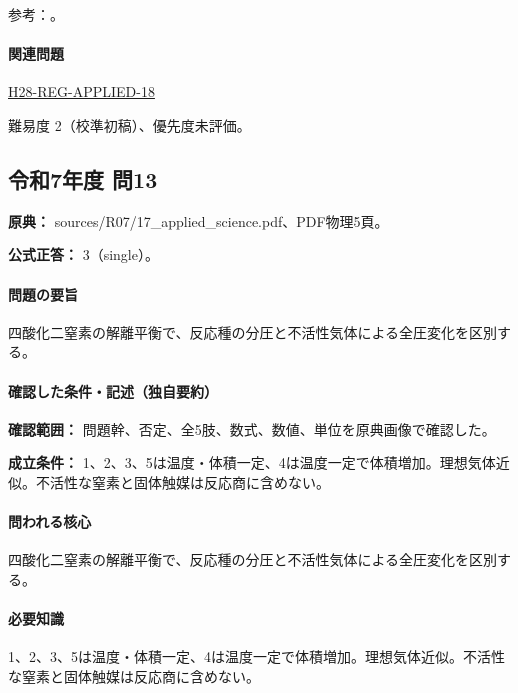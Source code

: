 \par 参考：\cite{iupac_greenbook2012}。

\paragraph{関連問題} \hyperref[q:h28-reg-applied-18]{H28-REG-APPLIED-18}

\par 難易度 2（校準初稿）、優先度未評価。

\subsection{令和7年度 問13}
\label{q:r07-reg-applied-13}

\noindent\textbf{原典：} sources/R07/17\_applied\_science.pdf、PDF物理5頁。

\textbf{公式正答：} 3（single）。

\paragraph{問題の要旨} 四酸化二窒素の解離平衡で、反応種の分圧と不活性気体による全圧変化を区別する。

\paragraph{確認した条件・記述（独自要約）}\mbox{}\par

\noindent\textbf{確認範囲：} 問題幹、否定、全5肢、数式、数値、単位を原典画像で確認した。\par

\noindent\textbf{成立条件：} 1、2、3、5は温度・体積一定、4は温度一定で体積増加。理想気体近似。不活性な窒素と固体触媒は反応商に含めない。\par

\paragraph{問われる核心} 四酸化二窒素の解離平衡で、反応種の分圧と不活性気体による全圧変化を区別する。

\paragraph{必要知識} 1、2、3、5は温度・体積一定、4は温度一定で体積増加。理想気体近似。不活性な窒素と固体触媒は反応商に含めない。

